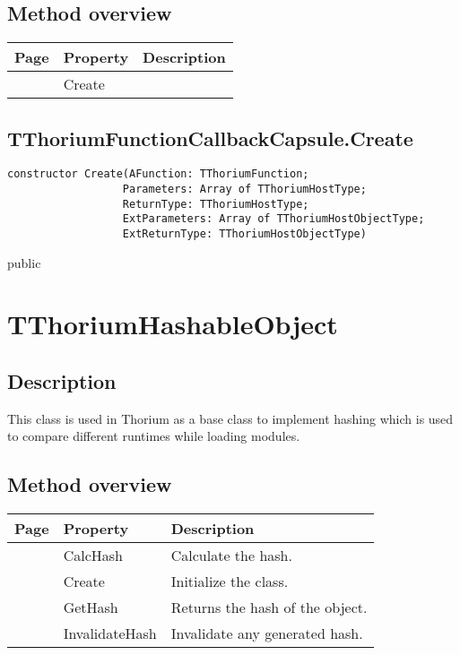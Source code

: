 \subsection{Method overview}
\label{thoriumcorepkg:thorium:tthoriumfunctioncallbackcapsule:methods}
\begin{tabularx}{\textwidth}{llX}
Page & Property & Description  \\ \hline
\pageref{thoriumcorepkg:thorium:tthoriumfunctioncallbackcapsule:create} & Create  &  \\
\hline
\end{tabularx}
\subsection{TThoriumFunctionCallbackCapsule.Create}
\label{thoriumcorepkg:thorium:tthoriumfunctioncallbackcapsule:create}
\begin{FPCList}
\Declaration 

\begin{verbatim}
constructor Create(AFunction: TThoriumFunction;
                  Parameters: Array of TThoriumHostType;
                  ReturnType: TThoriumHostType;
                  ExtParameters: Array of TThoriumHostObjectType;
                  ExtReturnType: TThoriumHostObjectType)
\end{verbatim}
\Visibility
public
\end{FPCList}
\section{TThoriumHashableObject}
\label{thoriumcorepkg:thorium:tthoriumhashableobject}
\subsection{Description}
This class is used in Thorium as a base class to implement hashing which is used to compare different runtimes while loading modules.%
\subsection{Method overview}
\label{thoriumcorepkg:thorium:tthoriumhashableobject:methods}
\begin{tabularx}{\textwidth}{llX}
Page & Property & Description  \\ \hline
\pageref{thoriumcorepkg:thorium:tthoriumhashableobject:calchash} & CalcHash  & Calculate the hash. \\
\pageref{thoriumcorepkg:thorium:tthoriumhashableobject:create} & Create  & Initialize the class. \\
\pageref{thoriumcorepkg:thorium:tthoriumhashableobject:gethash} & GetHash  & Returns the hash of the object. \\
\pageref{thoriumcorepkg:thorium:tthoriumhashableobject:invalidatehash} & InvalidateHash  & Invalidate any generated hash. \\
\hline
\end{tabularx}
